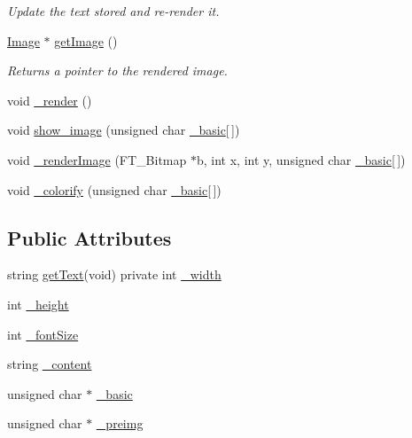 \begin{DoxyCompactItemize}
\begin{DoxyCompactList}\small\item\em Update the text stored and re-\/render it. \end{DoxyCompactList}\item 
\hyperlink{class_image}{Image} $\ast$ \hyperlink{class_text_ab70ee3b32a21afc611059d70f2b8d3e1}{get\-Image} ()
\begin{DoxyCompactList}\small\item\em Returns a pointer to the rendered image. \end{DoxyCompactList}\item 
void \hyperlink{class_text_a4396305453547c8d71dd46d795009b02}{\-\_\-render} ()
\item 
void \hyperlink{class_text_a5e5826dc2c6d4d80e4d37dbe7a7d54a4}{show\-\_\-image} (unsigned char \hyperlink{class_text_af7626cc2cb8f3ef223e0fd202d6146a9}{\-\_\-basic}\mbox{[}$\,$\mbox{]})
\item 
void \hyperlink{class_text_a4b14b210723bf4c1a22c07c0fe5fe9a9}{\-\_\-render\-Image} (F\-T\-\_\-\-Bitmap $\ast$b, int x, int y, unsigned char \hyperlink{class_text_af7626cc2cb8f3ef223e0fd202d6146a9}{\-\_\-basic}\mbox{[}$\,$\mbox{]})
\item 
void \hyperlink{class_text_a95473d618cb33aa0703047f3d345d073}{\-\_\-colorify} (unsigned char \hyperlink{class_text_af7626cc2cb8f3ef223e0fd202d6146a9}{\-\_\-basic}\mbox{[}$\,$\mbox{]})
\end{DoxyCompactItemize}
\subsection*{Public Attributes}
\begin{DoxyCompactItemize}
\item 
string \hyperlink{_text_8cpp_a787a8b4145449843adff9e020d9a4ffb}{get\-Text}(void) private int \hyperlink{class_text_a273978b9cc0d795ee4a19ca4c3aaa51c}{\-\_\-width}
\item 
int \hyperlink{class_text_aa4b29835f50543d0eb48973b441c7914}{\-\_\-height}
\item 
int \hyperlink{class_text_a5a283a4a90cd545aaf166a3b021e5888}{\-\_\-font\-Size}
\item 
string \hyperlink{class_text_a55efc4978055b131f1fe0e3b04f75808}{\-\_\-content}
\item 
unsigned char $\ast$ \hyperlink{class_text_af7626cc2cb8f3ef223e0fd202d6146a9}{\-\_\-basic}
\item 
unsigned char $\ast$ \hyperlink{class_text_a26d2fa0f8b96e1e64e9cd4d772969b03}{\-\_\-preimg}
\end{DoxyCompactItemize}


